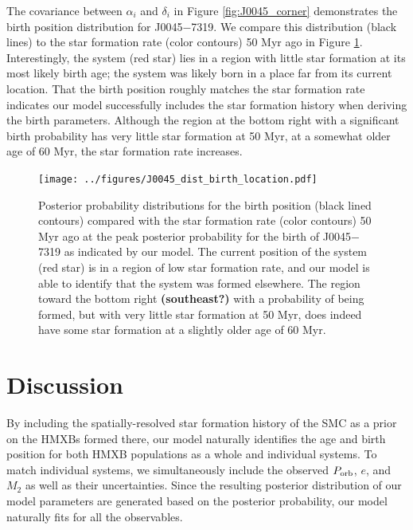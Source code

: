 \documentclass[12pt, preprint]{aastex}
\begin{document}
The covariance between $\alpha_i$ and $\delta_i$ in Figure \ref{fig:J0045_corner} demonstrates the birth position distribution for J0045$-$7319. We compare this distribution (black lines) to the star formation rate (color contours) 50 Myr ago in Figure \ref{fig:J0045_birth_dist}. Interestingly, the system (red star) lies in a region with little star formation at its most likely birth age; the system was likely born in a place far from its current location. That the birth position roughly matches the star formation rate indicates our model successfully includes the star formation history when deriving the birth parameters. Although the region at the bottom right with a significant birth probability has very little star formation at 50 Myr, at a somewhat older age of 60 Myr, the star formation rate increases.

\begin{figure}[h!]
\begin{center}
\texttt{[image: ../figures/J0045\_dist\_birth\_location.pdf]}
\caption{Posterior probability distributions for the birth position (black lined contours) compared with the star formation rate (color contours) 50 Myr ago at the peak posterior probability for the birth of J0045$-$7319 as indicated by our model. The current position of the system (red star) is in a region of low star formation rate, and our model is able to identify that the system was formed elsewhere. The region toward the bottom right {\bf (southeast?)} with a probability of being formed, but with very little star formation at 50 Myr, does indeed have some star formation at a slightly older age of 60 Myr.}
\label{fig:J0045_birth_dist}
\end{center}
\end{figure}





\section{Discussion}

By including the spatially-resolved star formation history of the SMC as a prior on the HMXBs formed there, our model naturally identifies the age and birth position for both HMXB populations as a whole and individual systems. To match individual systems, we simultaneously include the observed $P_{\rm orb}$, $e$, and $M_2$ as well as their uncertainties. Since the resulting posterior distribution of our model parameters are generated based on the posterior probability, our model naturally fits for all the observables. 
\end{document}
